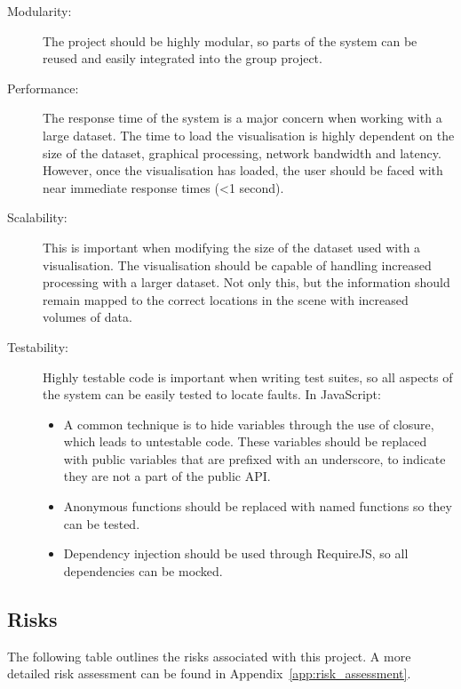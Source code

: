 \documentclass[
	fontsize=11pt
	headlines=2,
	footlines=2,
	parskip=half
]{scrartcl}
\begin{document}
{{			\begin{description}
				\item[Modularity:] The project should be highly modular, so parts of the system can be reused and easily integrated into the group project.
				\item[Performance:] The response time of the system is a major concern when working with a large dataset. The time to load the visualisation is highly dependent on the size of the dataset, graphical processing, network bandwidth and latency. However, once the visualisation has loaded, the user should be faced with near immediate response times (\textless 1 second).
				\item[Scalability:] This is important when modifying the size of the dataset used with a visualisation. The visualisation should be capable of handling increased processing with a larger dataset. Not only this, but the information should remain mapped to the correct locations in the scene with increased volumes of data.
				\item[Testability:] Highly testable code is important when writing test suites, so all aspects of the system can be easily tested to locate faults. In JavaScript:
					\begin{itemize}
						\item A common technique is to hide variables through the use of closure, which leads to untestable code. These variables should be replaced with public variables that are prefixed with an underscore, to indicate they are not a part of the public API.
						\item Anonymous functions should be replaced with named functions so they can be tested.
						\item Dependency injection should be used through RequireJS, so all dependencies can be mocked.
					\end{itemize}
			\end{description}

		}
		
		\subsection{Risks} {
		\label{sec:risks}

			The following table outlines the risks associated with this project. A more detailed risk assessment can be found in Appendix~\ref{app:risk_assessment}.
			
}}
\end{document}

